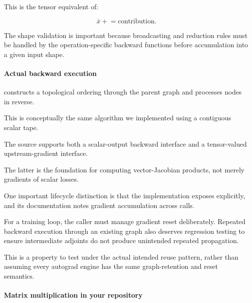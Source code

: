 This is the tensor equivalent of:

\[
\bar x\mathrel{+}=\text{contribution}.
\]

The shape validation is important because broadcasting and reduction rules must be handled by the operation-specific backward functions before accumulation into a given input shape.

\paragraph{Actual backward execution}\label{02-foundations-ii-ch022-actual-backward-execution}

\hypertarget{02-foundations-ii-ch022-actual-backward-execution}{}

 constructs a topological ordering through the parent graph and processes nodes in reverse.

This is conceptually the same algorithm we implemented using a contiguous scalar tape.

The source supports both a scalar-output backward interface and a tensor-valued upstream-gradient interface.

The latter is the foundation for computing vector-Jacobian products, not merely gradients of scalar losses.

One important lifecycle distinction is that the implementation exposes  explicitly, and its documentation notes gradient accumulation across calls.

For a training loop, the caller must manage gradient reset deliberately. Repeated backward execution through an existing graph also deserves regression testing to ensure intermediate adjoints do not produce unintended repeated propagation.

This is a property to test under the actual intended reuse pattern, rather than assuming every autograd engine has the same graph-retention and reset semantics.

\paragraph{Matrix multiplication in your repository}\label{02-foundations-ii-ch022-matrix-multiplication-in-your-repository}

\hypertarget{02-foundations-ii-ch022-matrix-multiplication-in-your-repository}{}


